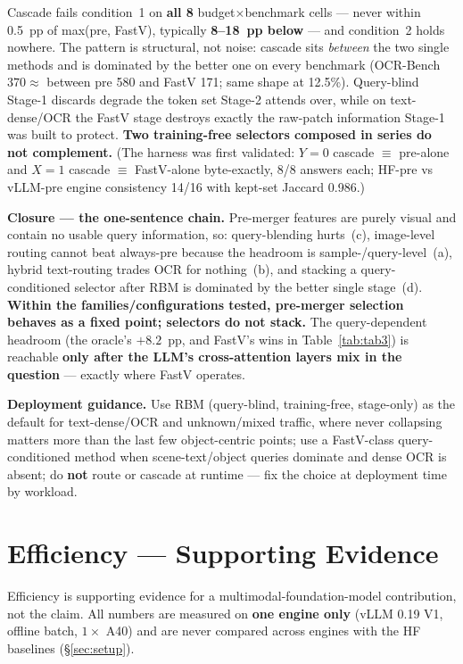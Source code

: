 \documentclass[sigconf,review,anonymous]{acmart}
\begin{document}
Cascade fails condition~1 on \textbf{all 8} budget$\times$benchmark cells ---
never within 0.5~pp of max(pre, FastV), typically \textbf{8--18~pp below} ---
and condition~2 holds nowhere. The pattern is structural, not noise: cascade
sits \emph{between} the two single methods and is dominated by the better one on
every benchmark (OCR-Bench $370 \approx$ between pre 580 and FastV 171; same
shape at 12.5\%). Query-blind Stage-1 discards degrade the token set Stage-2
attends over, while on text-dense/OCR the FastV stage destroys exactly the
raw-patch information Stage-1 was built to protect. \textbf{Two training-free
selectors composed in series do not complement.} (The harness was first
validated: $Y = 0$ cascade $\equiv$ pre-alone and $X = 1$ cascade $\equiv$
FastV-alone byte-exactly, 8/8 answers each; HF-pre vs vLLM-pre engine
consistency 14/16 with kept-set Jaccard 0.986.)

\textbf{Closure --- the one-sentence chain.} Pre-merger features are purely
visual and contain no usable query information, so: query-blending hurts~(c),
image-level routing cannot beat always-pre because the headroom is
sample-/query-level~(a), hybrid text-routing trades OCR for nothing~(b), and
stacking a query-conditioned selector after RBM is dominated by the better
single stage~(d). \textbf{Within the families/configurations tested, pre-merger
selection behaves as a fixed point; selectors do not stack.} The
query-dependent headroom (the oracle's $+8.2$~pp, and FastV's wins in
Table~\ref{tab:tab3}) is reachable \textbf{only after the LLM's cross-attention
layers mix in the question} --- exactly where FastV operates.

\textbf{Deployment guidance.} Use RBM (query-blind, training-free, stage-only)
as the default for text-dense/OCR and unknown/mixed traffic, where never
collapsing matters more than the last few object-centric points; use a
FastV-class query-conditioned method when scene-text/object queries dominate and
dense OCR is absent; do \textbf{not} route or cascade at runtime --- fix the
choice at deployment time by workload.

\section{Efficiency --- Supporting Evidence}\label{sec:efficiency}

Efficiency is supporting evidence for a multimodal-foundation-model
contribution, not the claim. All numbers are measured on \textbf{one engine
only} (vLLM 0.19 V1, offline batch, $1\times$ A40) and are never compared across
engines with the HF baselines (\S\ref{sec:setup}).
\end{document}

